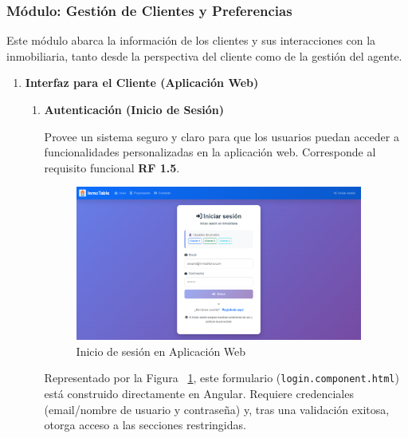 \clearpage


\subsubsection{Módulo: Gestión de Clientes y Preferencias}


Este módulo abarca la información de los clientes y sus interacciones con la inmobiliaria, tanto desde la perspectiva del cliente como de la gestión del agente.

\begin{enumerate}

    \item \textbf{Interfaz para el Cliente (Aplicación Web)}

    \begin{enumerate}

        \item \textbf{Autenticación (Inicio de Sesión)}

        Provee un sistema seguro y claro para que los usuarios puedan acceder a funcionalidades personalizadas en la aplicación web. Corresponde al requisito funcional \textbf{RF 1.5}.

        \begin{figure}[H]
            \begin{center}
                \includegraphics[width = 0.95\textwidth]{Figuras/login.png}
            \end{center}
            \caption{\label{fig:login} Inicio de sesión en Aplicación Web}
        \end{figure}

        Representado por la Figura ~\ref{fig:login}, este formulario (\texttt{login.component.html}) está construido directamente en Angular. Requiere credenciales (email/nombre de usuario y contraseña) y, tras una validación exitosa, otorga acceso a las secciones restringidas.


\end{enumerate}
\end{enumerate}
